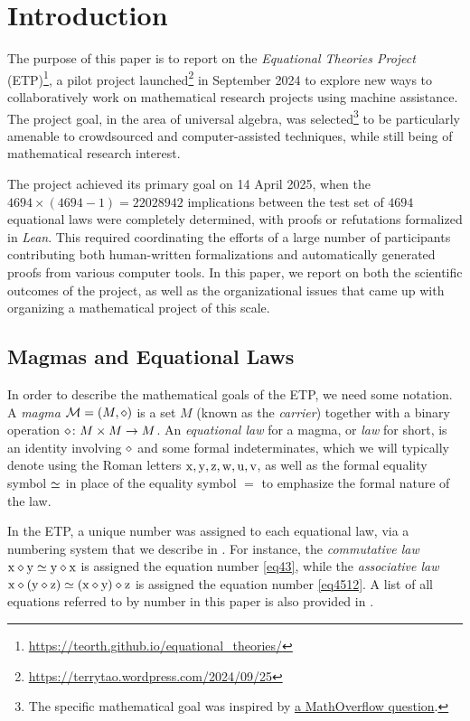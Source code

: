 \section{Introduction}

The purpose of this paper is to report on the \emph{Equational Theories Project} (ETP)\footnote{\url{https://teorth.github.io/equational_theories/}}, a pilot project launched\footnote{\url{https://terrytao.wordpress.com/2024/09/25}} in September 2024 to explore new ways to collaboratively work on mathematical research projects using machine assistance. The project goal, in the area of universal algebra, was selected\footnote{The specific mathematical goal was inspired by \href{https://mathoverflow.net/questions/450930}{a MathOverflow question}.} to be particularly amenable to crowdsourced and computer-assisted techniques, while still being of mathematical research interest.

The project achieved its primary goal on 14 April 2025, when the $\num{4694} \times (\num{4694}-1) = \num{22028942}$ implications between the test set of $\num{4694}$ equational laws were completely determined, with proofs or refutations formalized in \emph{Lean}.  This required coordinating the efforts of a large number of participants contributing both human-written formalizations and automatically generated proofs from various computer tools.  In this paper, we report on both the scientific outcomes of the project, as well as the organizational issues that came up with organizing a mathematical project of this scale.

\subsection{Magmas and Equational Laws}

In order to describe the mathematical goals of the ETP, we need some notation. A \emph{magma} ${\mathcal{M}} = (M,\diamond)$ is a set $M$ (known as the \emph{carrier}) together with a binary operation $\diamond \colon M \times M \to M$. An \emph{equational law} for a magma, or \emph{law} for short, is an identity involving $\diamond$ and some formal indeterminates, which we will typically denote using the Roman letters $\mathrm{x},\mathrm{y},\mathrm{z},\mathrm{w},\mathrm{u},\mathrm{v}$, as well as the formal equality symbol $\simeq$ in place of the equality symbol $=$ to emphasize the formal nature of the law.

In the ETP, a unique number was assigned to each equational law, via a numbering system that we describe in .  For instance, the \emph{commutative law} $\mathrm{x} \diamond \mathrm{y} \simeq \mathrm{y} \diamond \mathrm{x}$ is assigned the equation number \eqref{eq43}, while the \emph{associative law} $\mathrm{x} \diamond (\mathrm{y} \diamond \mathrm{z}) \simeq (\mathrm{x} \diamond \mathrm{y}) \diamond \mathrm{z}$ is assigned the equation number \eqref{eq4512}.  A list of all equations referred to by number in this paper is also provided in .

